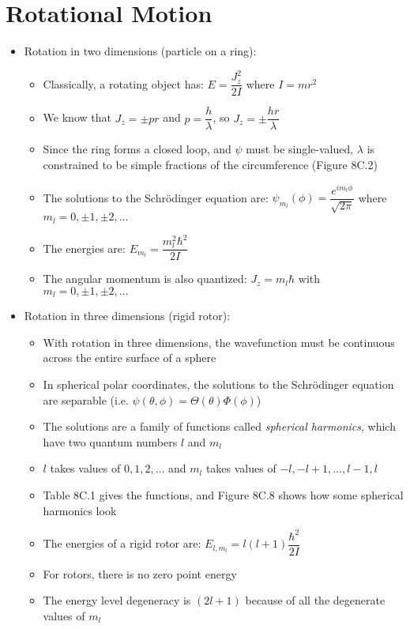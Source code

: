 \documentclass[12pt, openany, letterpaper]{memoir}
\begin{document}
\section{Rotational Motion}
\begin{itemize}
	\item Rotation in two dimensions (particle on a ring):
	\begin{itemize}
		\item Classically, a rotating object has: $E=\dfrac{J_z^2}{2I}$ where $I=mr^2$
		\item We know that $J_z=\pm pr$ and $p=\dfrac{h}{\lambda}$, so $J_z=\pm\dfrac{hr}{\lambda}$
		\item Since the ring forms a closed loop, and $\psi$ must be single-valued, $\lambda$ is constrained to be simple fractions of the circumference (Figure 8C.2)
		\item The solutions to the Schr\"odinger equation are: $\psi_{m_l}(\phi) = \dfrac{e^{im_l\phi}}{\sqrt{2\pi}}$ where $m_l = 0, \pm1, \pm2,\ldots$
		\item The energies are: $E_{m_l}=\dfrac{m_l^2\hbar^2}{2I}$
		\item The angular momentum is also quantized: $J_z=m_l\hbar$ with $m_l=0,\pm1,  \pm2,\ldots$		
	\end{itemize}
	\item Rotation in three dimensions (rigid rotor):
	\begin{itemize}
		\item With rotation in three dimensions, the wavefunction must be continuous across the entire surface of a sphere
		\item In spherical polar coordinates, the solutions to the Schr\"odinger equation are separable (i.e. $\psi(\theta, \phi) = \Theta(\theta)\Phi(\phi)$)
		\item The solutions are a family of functions called \emph{spherical harmonics}, which have two quantum numbers $l$ and $m_l$
		\item $l$ takes values of $0,1,2,\ldots$ and $m_l$ takes values of $-l,-l+1,\ldots,l-1,l$
		\item Table 8C.1 gives the functions, and Figure 8C.8 shows how some spherical harmonics look
		\item The energies of a rigid rotor are: $E_{l,m_l}=l(l+1)\dfrac{\hbar^2}{2I}$
		\item For rotors, there is no zero point energy
		\item The energy level degeneracy is $(2l+1)$ because of all the degenerate values of $m_l$

\end{itemize}
\end{itemize}
\end{document}
